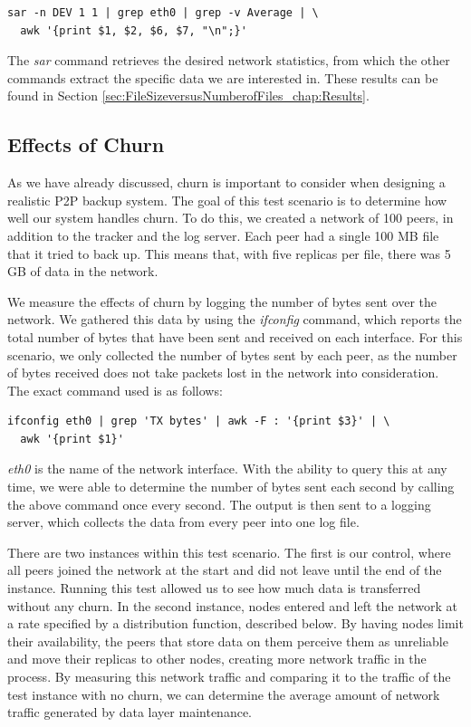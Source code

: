 \documentclass[12pt]{report}
\begin{document}
\begin{verbatim}
sar -n DEV 1 1 | grep eth0 | grep -v Average | \
  awk '{print $1, $2, $6, $7, "\n";}'
\end{verbatim}

The \textit{sar} command retrieves the desired network statistics, from which the other commands extract the specific data we are interested in. These results can be found in Section \ref{sec:FileSizeversusNumberofFiles_chap:Results}.

\subsection{Effects of Churn} \label{subsec:EffectsofChurn_sec:TestScenarios_chap:Methodology}

As we have already discussed, churn is important to consider when designing a realistic P2P backup system. The goal of this test scenario is to determine how well our system handles churn. To do this, we created a network of 100 peers, in addition to the tracker and the log server. Each peer had a single 100 MB file that it tried to back up. This means that, with five replicas per file, there was 5 GB of data in the network.

We measure the effects of churn by logging the number of bytes sent over the network. We gathered this data by using the \textit{ifconfig} command, which reports the total number of bytes that have been sent and received on each interface. For this scenario, we only collected the number of bytes sent by each peer, as the number of bytes received does not take packets lost in the network into consideration. The exact command used is as follows:

\begin{verbatim}
ifconfig eth0 | grep 'TX bytes' | awk -F : '{print $3}' | \
  awk '{print $1}'
\end{verbatim}

\textit{eth0} is the name of the network interface. With the ability to query this at any time, we were able to determine the number of bytes sent each second by calling the above command once every second. The output is then sent to a logging server, which collects the data from every peer into one log file.

There are two instances within this test scenario. The first is our control, where all peers joined the network at the start and did not leave until the end of the instance. Running this test allowed us to see how much data is transferred without any churn. In the second instance, nodes entered and left the network at a rate specified by a distribution function, described below. By having nodes limit their availability, the peers that store data on them perceive them as unreliable and move their replicas to other nodes, creating more network traffic in the process. By measuring this network traffic and comparing it to the traffic of the test instance with no churn, we can determine the average amount of network traffic generated by data layer maintenance.
\end{document}
